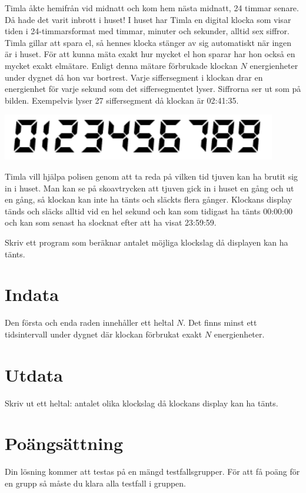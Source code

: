 Timla åkte hemifrån vid midnatt och kom hem nästa midnatt, 24 timmar senare. Då hade det varit inbrott i huset! 
I huset har Timla en digital klocka som visar tiden i 24-timmarsformat med timmar, minuter och sekunder, alltid sex siffror. Timla gillar att spara el, så hennes klocka stänger av sig automatiskt när ingen är i huset. För att kunna mäta exakt hur mycket el hon sparar har hon också en mycket exakt elmätare. Enligt denna mätare förbrukade klockan $N$ energienheter under dygnet då hon var bortrest. Varje siffersegment i klockan drar en energienhet för varje sekund som det siffersegmentet lyser. Siffrorna ser ut som på bilden. Exempelvis lyser 27 siffersegment då klockan är 02:41:35.

\begin{center}
  \includegraphics[width=12cm]{illustration.png}
\end{center}

Timla vill hjälpa polisen genom att ta reda på vilken tid tjuven kan ha brutit sig in i huset. Man kan se på skoavtrycken att tjuven gick in i huset en gång och ut en gång, så klockan kan inte ha tänts och släckts flera gånger. Klockans display tänds och släcks alltid vid en hel sekund och kan som tidigast ha tänts 00:00:00 och kan som senast ha slocknat efter att ha visat 23:59:59.

Skriv ett program som beräknar antalet möjliga klockslag då displayen kan ha tänts. 

\section*{Indata}
Den första och enda raden innehåller ett heltal $N$. Det finns minst ett tidsintervall under dygnet där klockan förbrukat exakt $N$ energienheter.

\section*{Utdata}
Skriv ut ett heltal: antalet olika klockslag då klockans display kan ha tänts. 

\section*{Poängsättning}
Din lösning kommer att testas på en mängd testfallsgrupper.
För att få poäng för en grupp så måste du klara alla testfall i gruppen.

